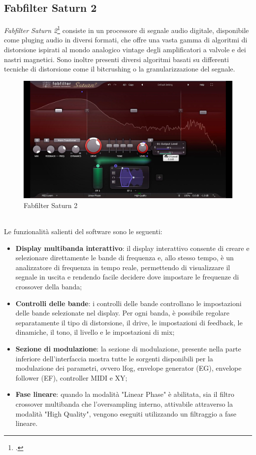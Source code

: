 \subsection*{Fabfilter Saturn 2}
\noindent \textit{Fabfilter Saturn 2}\footcite{site:saturn2} consiste in un processore di segnale audio digitale, disponibile come \gls{pluging} audio in diversi formati, che offre una vasta gamma di algoritmi di distorsione ispirati al mondo analogico vintage degli amplificatori a valvole e dei nastri magnetici. Sono inoltre presenti diversi algoritmi basati su differenti tecniche di distorsione come il bitcrushing o la granularizzazione del segnale. 
\begin{figure}[!h] 
    \centering 
    \includegraphics[width=0.8\columnwidth]{immagini/cap2/saturn2.jpg}
    \caption{Fabfilter Saturn 2}
\end{figure} \\
Le funzionalità salienti del software sono le seguenti:
\begin{itemize}
    \item \textbf{Display multibanda interattivo}: il display interattivo consente di creare e selezionare direttamente le bande di frequenza e, allo stesso tempo, è un analizzatore di frequenza in tempo reale, permettendo di visualizzare il segnale in uscita e rendendo facile decidere dove impostare le frequenze di crossover della banda;
    \item \textbf{Controlli delle bande}: i controlli delle bande controllano le impostazioni delle bande selezionate nel display. Per ogni banda, è possibile regolare separatamente il tipo di distorsione, il drive, le impostazioni di feedback, le dinamiche, il tono, il livello e le impostazioni di mix;
    \item \textbf{Sezione di modulazione}: la sezione di modulazione, presente nella parte inferiore dell'interfaccia mostra tutte le sorgenti disponibili per la modulazione dei parametri, ovvero  \gls{lfog}, envelope generator (EG), envelope follower (EF), controller MIDI e XY;
    \item \textbf{Fase lineare}: quando la modalità "Linear Phase" è abilitata, sia il filtro crossover multibanda che l'oversampling interno, attivabile attraverso la modalità "High Quality", vengono eseguiti utilizzando un filtraggio a fase lineare.
\end{itemize}